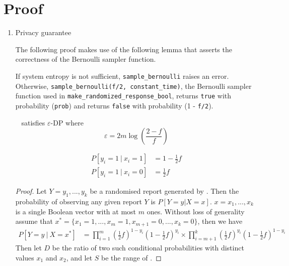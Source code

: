 \documentclass{article}
\begin{document}
\section{Proof}
\begin{enumerate}
	\item Privacy guarantee
\begin{tcolorbox}
\begin{note}
The following proof makes use of the following lemma that asserts the correctness of the Bernoulli sampler function.
    \begin{lemma}
    If system entropy is not sufficient, \texttt{sample\_bernoulli} raises an error. 
    Otherwise, \texttt{sample\_bernoulli(f/2, constant\_time)}, the Bernoulli sampler function used in \texttt{make\_randomized\_response\_bool}, 
    returns \texttt{true} with probability (\texttt{prob}) and returns  \texttt{false} with probability (1 - \texttt{f/2}).
    \end{lemma}
\end{note}
\end{tcolorbox}
\begin{theorem}~\cite{rappor}
	 satisfies $\varepsilon$-DP where 
	\begin{equation*}
		\varepsilon = 2m\log\left(\frac{2-f}{f}\right)
	\end{equation*}
\end{theorem}
\begin{lemma}
	\begin{align}
		P[y_i = 1~|~x_i=1] &= 1 - \frac{1}{2}f\\
		P[y_i = 1~|~x_i=0] &=\frac{1}{2}f
	\end{align}
\end{lemma}
\begin{proof}
	Let $Y=y_1,...,y_k$ be a randomised report generated by . Then the probability of observing any given report $Y$ is $P[Y=y | X=x]$. $x=x_1,...,x_k$ is a single Boolean vector with at most $m$ ones. 
	Without loss of generality assume that $x^*=\{x_1=1,...,x_m=1,x_{m+1}=0,...,x_k=0\}$, then we have
	\begin{align*}
		P[Y=y~|~X=x^*] &=%
			\prod\limits_{i=1}^m \left(\frac{1}{2}f\right)^{1-y_i}\left(1-\frac{1}{2}f\right)^{y_i}%
			\times \prod\limits_{i=m+1}^k\left(\frac{1}{2}f\right)^{y_i} \left(1-\frac{1}{2}f\right)^{1-y_i}
	\end{align*}
	Then let $D$ be the ratio of two such conditional probabilities with distinct values $x_1$ and $x_2$, and let $S$ be the range of .

\end{proof}
\end{enumerate}
\end{document}
